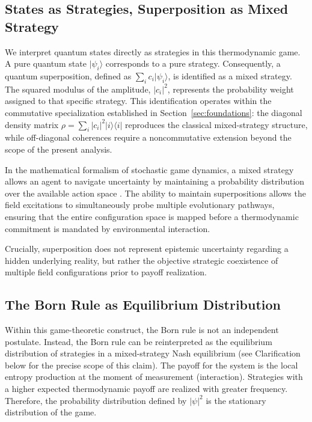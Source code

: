 \documentclass[12pt,a4paper]{article}
\theoremstyle{remark}
\begin{document}
\subsection{States as Strategies, Superposition as Mixed Strategy}

We interpret quantum states directly as strategies in this thermodynamic game. A pure quantum state $|\psi_i\rangle$ corresponds to a pure strategy. Consequently, a quantum superposition, defined as $\sum_i c_i |\psi_i\rangle$, is identified as a mixed strategy. The squared modulus of the amplitude, $|c_i|^2$, represents the probability weight assigned to that specific strategy. This identification operates within the commutative specialization established in Section~\ref{sec:foundations}: the diagonal density matrix $\rho = \sum_i |c_i|^2 |i\rangle\langle i|$ reproduces the classical mixed-strategy structure, while off-diagonal coherences require a noncommutative extension beyond the scope of the present analysis.

In the mathematical formalism of stochastic game dynamics, a mixed strategy allows an agent to navigate uncertainty by maintaining a probability distribution over the available action space \citep{BusemeyerBruza2012}. The ability to maintain superpositions allows the field excitations to simultaneously probe multiple evolutionary pathways, ensuring that the entire configuration space is mapped before a thermodynamic commitment is mandated by environmental interaction.

Crucially, superposition does not represent epistemic uncertainty regarding a hidden underlying reality, but rather the objective strategic coexistence of multiple field configurations prior to payoff realization.

\subsection{The Born Rule as Equilibrium Distribution}

Within this game-theoretic construct, the Born rule is not an independent postulate. Instead, the Born rule can be reinterpreted as the equilibrium distribution of strategies in a mixed-strategy Nash equilibrium (see Clarification below for the precise scope of this claim). The payoff for the system is the local entropy production at the moment of measurement (interaction). Strategies with a higher expected thermodynamic payoff are realized with greater frequency. Therefore, the probability distribution defined by $|\psi|^2$ is the stationary distribution of the game.
\end{document}
